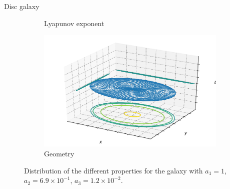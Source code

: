 \documentclass{beamer}
\begin{document}
\begin{frame}{Disc galaxy}
\begin{figure}[h]
\begin{subfigure}[t]{0.35\textwidth}
			\caption{Lyapunov exponent}
		\end{subfigure}
		\begin{subfigure}[t]{0.35\textwidth}
			\includegraphics[width=\textwidth]{"../Files/Week 13/images/3_ellipsoid"}
			\caption{Geometry}
		\end{subfigure}
		\caption{Distribution of the different properties for the galaxy with $a_1 = 1$, $a_2 = 6.9\times10^{-1}$, $a_3 = 1.2\times10^{-2}$.}
	\end{figure}
\end{frame}
\end{document}
